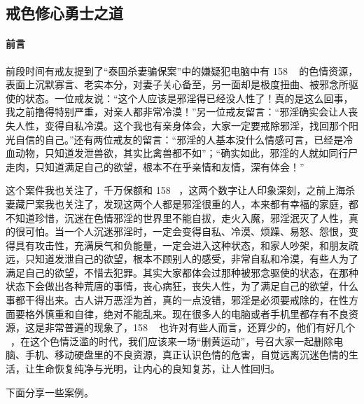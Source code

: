 \subsection{戒色修心勇士之道}

\paragraph*{前言}

前段时间有戒友提到了“泰国杀妻骗保案”中的嫌疑犯电脑中有 158 \unit{\giga\byte} 的色情资源，表面上沉默寡言、老实本分，对妻子关心备至，另一面却是极度扭曲、被邪念所驱使的状态。一位戒友说：“这个人应该是邪淫得已经没人性了！真的是这么回事，我之前撸得特别严重，对亲人都非常冷漠！”另一位戒友留言：“邪淫确实会让人丧失人性，变得自私冷漠。这个我也有亲身体会，大家一定要戒除邪淫，找回那个阳光自信的自己。”还有两位戒友的留言：“邪淫的人基本没什么情感可言，已经是冷血动物，只知道发泄兽欲，其实比禽兽都不如”；“确实如此，邪淫的人就如同行尸走肉，只知道满足自己的欲望，根本不在乎亲情和友情，深有体会！”

这个案件我也关注了，千万保额和 158 \unit{\giga\byte}，这两个数字让人印象深刻，之前上海杀妻藏尸案我也关注了，发现这两个人都是邪淫很重的人，本来都有幸福的家庭，都不知道珍惜，沉迷在色情邪淫的世界里不能自拔，走火入魔，邪淫泯灭了人性，真的很可怕。当一个人沉迷邪淫时，一定会变得自私、冷漠、烦躁、易怒、怨恨，变得具有攻击性，充满戾气和负能量，一定会进入这种状态，和家人吵架，和朋友疏远，只知道发泄自己的欲望，根本不顾别人的感受，非常自私和冷漠，有些人为了满足自己的欲望，不惜去犯罪。其实大家都体会过那种被邪念驱使的状态，在那种状态下会做出各种荒唐的事情，丧心病狂，丧失人性，为了满足自己的欲望，什么事都干得出来。古人讲万恶淫为首，真的一点没错，邪淫是必须要戒除的，在性方面要格外慎重和自律，绝对不能乱来。现在很多人的电脑或者手机里都存有不良资源，这是非常普遍的现象了，158 \unit{\giga\byte} 也许对有些人而言，还算少的，他们有好几个 \unit{\tera\byte}，在这个色情泛滥的时代，我们应该来一场“删黄运动”，号召大家一起删除电脑、手机、移动硬盘里的不良资源，真正认识色情的危害，自觉远离沉迷色情的生活，让生命恢复纯净与光明，让内心的良知复苏，让人性回归。

下面分享一些案例。

